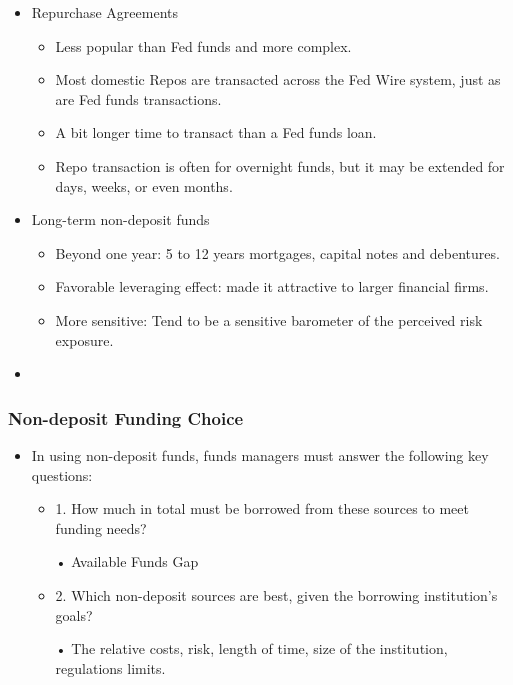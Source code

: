 \begin{itemize}
\begin{itemize}
        \begin{itemize}
        \item  Purchase off-book loans of other financial firms in same organization, giving these firms funds to make new loans.
        \end{itemize}
    \end{itemize}
   
    
\item Repurchase Agreements
    \begin{itemize}
    \item Less popular than Fed funds and more complex.
    \item Most domestic Repos are transacted across the Fed Wire system, just as are Fed funds transactions.
    \item A bit longer time to transact than a Fed funds loan.
    \item Repo transaction is often for overnight funds, but it may be extended for days, weeks, or even months.
    \end{itemize}
    
\item Long-term non-deposit funds
    \begin{itemize}
    \item Beyond one year: 5 to 12 years mortgages, capital notes and debentures.
    \item Favorable leveraging effect: made it attractive to larger financial firms.
    \item More sensitive: Tend to be a sensitive barometer of the perceived risk exposure.
    \end{itemize}
    
\item 
\end{itemize}



\subsubsection{Non-deposit Funding Choice}
\begin{itemize}
\item In using non-deposit funds, funds managers must answer the following key questions:
    \begin{itemize}
    \item 1. How much in total must be borrowed from these sources to meet funding needs?
    
    • Available Funds Gap
    \item 2. Which non-deposit sources are best, given the borrowing institution's goals?
    
    • The relative costs, risk, length of time, size of the institution, regulations limits.
    \end{itemize}
\end{itemize}



